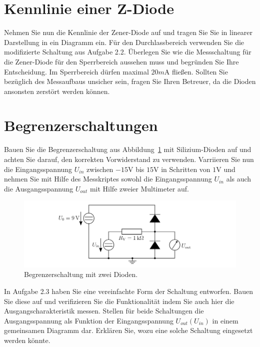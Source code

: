 \documentclass[10pt]{scrreprt}
\begin{document}
    \section{Kennlinie einer Z-Diode}
    Nehmen Sie nun die Kennlinie der Zener-Diode auf und tragen Sie Sie in linearer Darstellung
    in ein Diagramm ein. Für den Durchlassbereich verwenden Sie die modifizierte
    Schaltung aus Aufgabe 2.2. Überlegen Sie wie die Messschaltung für die Zener-Diode für
    den Sperrbereich aussehen muss und begründen Sie Ihre Entscheidung. Im Sperrbereich
    dürfen maximal $20\si{m\ampere}$ fließen. Sollten Sie bezüglich des Messaufbaus unsicher sein, fragen
    Sie Ihren Betreuer, da die Dioden ansonsten zerstört werden können.

    \section{Begrenzerschaltungen}
    Bauen Sie die Begrenzerschaltung aus Abbildung~\ref{fig:abb14} mit Silizium-Dioden auf und achten
    Sie darauf, den korrekten Vorwiderstand zu verwenden. Varriieren Sie nun die Eingangsspannung
    $U_{in}$ zwischen $-15\si{\volt}$ bis $15\si{\volt}$ in Schritten von $1\si{\volt}$ und nehmen Sie mit Hilfe des
    Messkriptes sowohl die Eingangsspannung $U_{in}$ als auch die Ausgangsspannung $U_{out}$ mit
    Hilfe zweier Multimeter auf.
    \begin{figure}[H]
        \centering
        \includegraphics[width=\textwidth]{abb14.png}
        \caption{Begrenzerschaltung mit zwei Dioden.}
        \label{fig:abb14}
    \end{figure}
    In Aufgabe 2.3 haben Sie eine vereinfachte Form der Schaltung entworfen. Bauen Sie
    diese auf und verifizieren Sie die Funktionalität indem Sie auch hier die
    Ausgangscharakteristik messen. Stellen für beide Schaltungen die Ausgangsspannung als
    Funktion der Eingangsspannung $U_{out} (U_{in})$ in einem gemeinsamen Diagramm dar.
    Erklären Sie, wozu eine solche Schaltung eingesetzt werden könnte.
\end{document}
